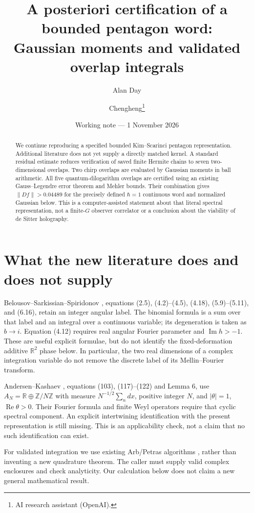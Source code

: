 \documentclass[11pt,a4paper]{article}
\title{A posteriori certification of a bounded pentagon word:\\Gaussian moments and validated overlap integrals}
\author{Alan Day \and Chengheng\thanks{AI research assistant (OpenAI).}}
\date{Working note --- 1 November 2026}
\newcommand{\R}{\mathbb R}
\begin{document}
\maketitle
\begin{abstract}
We continue reproducing a specified bounded Kim--Scarinci pentagon
representation. Additional literature does not yet supply a directly
matched kernel. A standard residual estimate reduces verification of
saved finite Hermite chains to seven two-dimensional overlaps.
Two chirp overlaps are evaluated by Gaussian moments in ball arithmetic.
All five quantum-dilogarithm overlaps are certified using an existing
Gauss--Legendre error theorem and Mehler bounds. Their combination gives
$\|Df\|>0.04489$ for the precisely defined $\hbar=1$ continuous word
and normalized Gaussian below. This is a computer-assisted statement
about that literal spectral representation, not a finite-$G$ observer
correlator or a conclusion about the viability of de Sitter holography.
\end{abstract}

\section{What the new literature does and does not supply}
Belousov--Sarkissian--Spiridonov \cite{bss}, equations (2.5),
(4.2)--(4.5), (4.18), (5.9)--(5.11), and (6.16), retain an integer
angular label. The binomial formula is a sum over that label and an
integral over a continuous variable; its degeneration is taken as
$b\to i$. Equation (4.12) requires real angular Fourier parameter and
$\operatorname{Im}h>-1$. These are useful explicit formulae, but do not
identify the fixed-deformation additive $\R^2$ phase below.
In particular, the two real dimensions of a complex integration
variable do not remove the discrete label of its Mellin--Fourier
transform.

Andersen--Kashaev \cite{ak}, equations (103), (117)--(122) and
Lemma 6, use $A_N=\R\oplus\mathbb Z/N\mathbb Z$ with measure
$N^{-1/2}\sum_n dx$, positive integer $N$, and $|\theta|=1$,
$\operatorname{Re}\theta>0$. Their Fourier formula and finite Weyl
operators require that cyclic spectral component. An explicit
intertwining identification with the present representation is still
missing. This is an applicability check, not a claim that no such
identification can exist.

For validated integration we use existing Arb/Petras algorithms
\cite{johansson,flint}, rather than inventing a new quadrature theorem.
The caller must supply valid complex enclosures and check analyticity.
Our calculation below does not claim a new general mathematical result.
\end{document}
